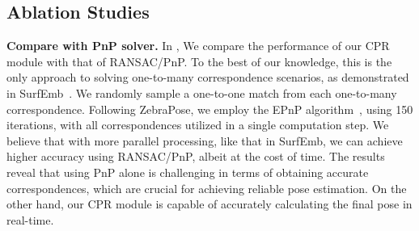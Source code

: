 

\subsection{Ablation Studies}

\textbf{Compare with PnP solver.} In , We compare the performance of our CPR module with that of RANSAC/PnP. To the best of our knowledge, this is the only approach to solving one-to-many correspondence scenarios, as demonstrated in SurfEmb~\cite{haugaard2022surfemb}. We randomly sample a one-to-one match from each one-to-many correspondence. Following ZebraPose, we employ the EPnP algorithm~\cite{EPnP}, using 150 iterations, with all correspondences utilized in a single computation step. We believe that with more parallel processing, like that in SurfEmb, we can achieve higher accuracy using RANSAC/PnP, albeit at the cost of time. The results reveal that using PnP alone is challenging in terms of obtaining accurate correspondences, which are crucial for achieving reliable pose estimation. On the other hand, our CPR module is capable of accurately calculating the final pose in real-time.

